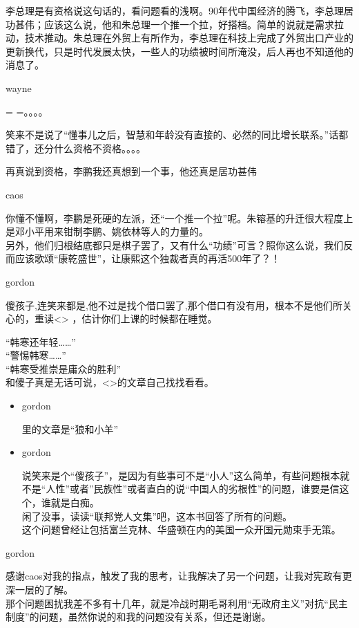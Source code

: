 李总理是有资格说这句话的，看问题看的浅啊。90年代中国经济的腾飞，李总理居功甚伟；应该这么说，他和朱总理一个推一个拉，好搭档。简单的说就是需求拉动，技术推动。朱总理在外贸上有所作为，李总理在科技上完成了外贸出口产业的更新换代，只是时代发展太快，一些人的功绩被时间所淹没，后人再也不知道他的消息了。

wayne

= =。。。。

笑来不是说了``懂事儿之后，智慧和年龄没有直接的、必然的同比增长联系。''话都错了，还分什么资格不资格。。。。

再真说到资格，李鹏我还真想到一个事，他还真是居功甚伟

caos

你懂不懂啊，李鹏是死硬的左派，还``一个推一个拉''呢。朱镕基的升迁很大程度上是邓小平用来钳制李鹏、姚依林等人的力量的。\\
另外，他们归根结底都只是棋子罢了，又有什么``功绩''可言？照你这么说，我们反而应该歌颂``康乾盛世''，让康熙这个独裁者真的再活500年了？！

gordon

傻孩子,连笑来都是,他不过是找个借口罢了,那个借口有没有用，根本不是他们所关心的，重读\textless{}\textgreater{}
，估计你们上课的时候都在睡觉。

``韩寒还年轻\ldots{}\ldots{}''\\ ``警惕韩寒\ldots{}\ldots{}''\\
``韩寒受推崇是庸众的胜利''\\
和傻子真是无话可说，\textless{}\textgreater{}的文章自己找找看看。

\begin{itemize}[<+->]
\item
  gordon

  里的文章是``狼和小羊''
\item
  gordon

  说笑来是个``傻孩子''，是因为有些事可不是``小人''这么简单，有些问题根本就不是``人性''或者''民族性''或者直白的说``中国人的劣根性''的问题，谁要是信这个，谁就是白痴。\\
  闲了没事，读读``联邦党人文集''吧，这本书回答了所有的问题。\\
  这个问题曾经让包括富兰克林、华盛顿在内的美国一众开国元勋束手无策。
\end{itemize}

gordon

感谢caos对我的指点，触发了我的思考，让我解决了另一个问题，让我对宪政有更深一层的了解。\\
那个问题困扰我差不多有十几年，就是冷战时期毛哥利用``无政府主义''对抗``民主制度''的问题，虽然你说的和我的问题没有关系，但还是谢谢。

